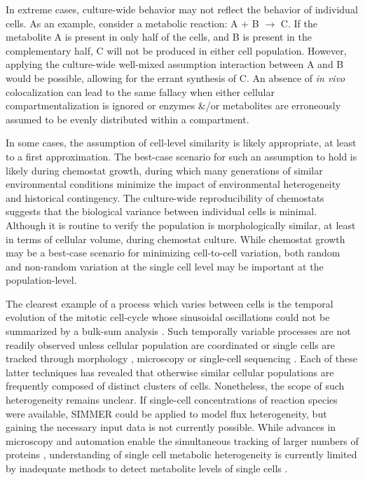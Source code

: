In extreme cases, culture-wide behavior may not reflect the behavior of individual cells. As an example, consider a metabolic reaction: A + B $\rightarrow$ C. If the metabolite A is present in only half of the cells, and B is present in the complementary half, C will not be produced in either cell population. However, applying the culture-wide well-mixed assumption interaction between A and B would be possible, allowing for the errant synthesis of C. An absence of \textit{in vivo} colocalization can lead to the same fallacy when either cellular compartmentalization is ignored or enzymes \&/or metabolites are erroneously assumed to be evenly distributed within a compartment.

In some cases, the assumption of cell-level similarity is likely appropriate, at least to a first approximation. The best-case scenario for such an assumption to hold is likely during chemostat growth, during which many generations of similar environmental conditions minimize the impact of environmental heterogeneity and historical contingency. The culture-wide reproducibility of chemostats suggests that the biological variance between individual cells is minimal. Although it is routine to verify the population is morphologically similar, at least in terms of cellular volume, during chemostat culture. While chemostat growth may be a best-case scenario for minimizing cell-to-cell variation, both random \cite{BarEven:2006dz, Kaern:2005gr} and non-random variation at the single cell level may be important at the population-level.

The clearest example of a process which varies between cells is the temporal evolution of the mitotic cell-cycle whose sinusoidal oscillations could not be summarized by a bulk-sum analysis \cite{Hartwell:1974uy, Spellman:1998wj}. Such temporally variable processes are not readily observed unless cellular population are coordinated \cite{Hartwell:1974uy, Tu:2006cl} or single cells are tracked through morphology \cite{Herskowitz:1988ut}, microscopy \cite{Venturelli:2015ec} or single-cell sequencing \cite{Patel:2014dt}. Each of these latter techniques has revealed that otherwise similar cellular populations are frequently composed of distinct clusters of cells. Nonetheless, the scope of such heterogeneity remains unclear. If single-cell concentrations of reaction species were available, SIMMER could be applied to model flux heterogeneity, but gaining the necessary input data is not currently possible. While advances in microscopy and automation enable the simultaneous tracking of larger numbers of proteins \cite{Ghaemmaghami:2003ds, Dubuis:2013cw}, understanding of single cell metabolic heterogeneity is currently limited by inadequate methods to detect metabolite levels of single cells \cite{Zenobi:2013il}.

